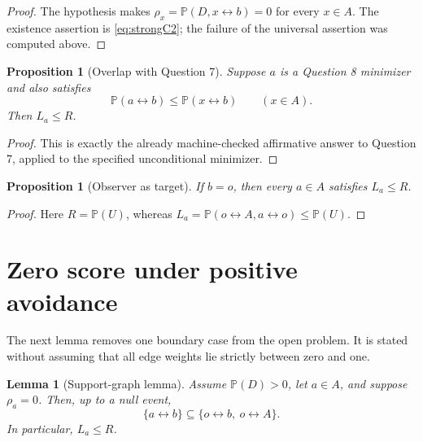 \documentclass[11pt]{article}
\newtheorem{proposition}[theorem]{Proposition}
\newtheorem{lemma}[theorem]{Lemma}
\theoremstyle{definition}
\newcommand{\PP}{\mathbb P}
\newcommand{\con}{\leftrightarrow}
\newcommand{\1}{\mathbf 1}
\begin{document}
\begin{proof}
The hypothesis makes \(\rho_x=\PP(D,x\con b)=0\) for every \(x\in A\).
The existence assertion is \eqref{eq:strongC2}; the failure of the universal
assertion was computed above.
\end{proof}

\begin{proposition}[Overlap with Question 7]\label{prop:q7}
Suppose \(a\) is a Question 8 minimizer and also satisfies
\[
 \PP(a\con b)\le \PP(x\con b)\qquad(x\in A).
\]
Then \(L_a\le R\).
\end{proposition}

\begin{proof}
This is exactly the already machine-checked affirmative answer to
Question 7, applied to the specified unconditional minimizer.
\end{proof}

\begin{proposition}[Observer as target]\label{prop:b=o}
If \(b=o\), then every \(a\in A\) satisfies \(L_a\le R\).
\end{proposition}

\begin{proof}
Here \(R=\PP(U)\), whereas
\(L_a=\PP(o\con A,a\con o)\le\PP(U)\).
\end{proof}

\section{Zero score under positive avoidance}

The next lemma removes one boundary case from the open problem.  It is
stated without assuming that all edge weights lie strictly between zero
and one.

\begin{lemma}[Support-graph lemma]\label{lem:zero-score}
Assume \(\PP(D)>0\), let \(a\in A\), and suppose \(\rho_a=0\).  Then,
up to a null event,
\begin{equation}\label{eq:inclusion-zero}
 \{a\con b\}\subseteq\{o\con b,\ o\con A\}.
\end{equation}
In particular, \(L_a\le R\).
\end{lemma}
\end{document}
